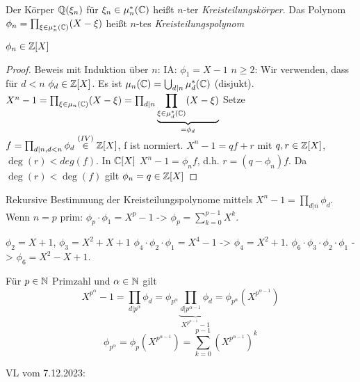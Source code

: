 \documentclass[../main.tex]{subfiles}
\begin{document}
\begin{definition}
    Der Körper $\mathbb{Q}(\xi_n)$ für $\xi_n\in\mu_n^*(\mathbb{C})$ heißt $n$-ter \emph{Kreisteilungskörper}.
    Das Polynom $\phi_n=\prod_{\xi\in\mu_n^*(\mathbb{C})} (X-\xi)$ heißt $n$-tes \emph{Kreisteilungspolynom}
\end{definition}

\begin{lemma}
    $\phi_n\in\mathbb{Z}[X]$
\end{lemma}
\begin{proof}
    Beweis mit Induktion über $n$:
    IA: $\phi_1 = X-1$ \checkmark
    $n\geq 2$: Wir verwenden, dass für $d<n$ $\phi_d\in \mathbb{Z}[X]$.
    Es ist $\mu_n(\mathbb{C}) = \bigcup_{d|n}\mu_d^*(\mathbb{C})$ (disjukt).
    $X^n-1 = \prod_{\xi\in\mu_n(\mathbb{C})} (X-\xi) = \prod_{d|n}\underbrace{\prod_{\xi\in\mu_d^*(\mathbb{C})}(X-\xi)}_{=\phi_d}$
    Setze $f = \prod_{d|n,d<n}\phi_d \overset{(IV)}{\in}\mathbb{Z}[X]$, f ist normiert.
    $X^n-1=qf+r$ mit $q,r\in \mathbb{Z}[X]$, $\deg(r)<deg(f)$.
    In $\mathbb{C}[X]$ $X^n-1=\phi_n f$, d.h. $r = (q-\phi_n) f$.
    Da $\deg(r)<\deg(f)$ gilt $\phi_n=q\in \mathbb{Z}[X]$
\end{proof}
\begin{remark}
    Rekursive Bestimmung der Kreisteilungspolynome mittels $X^n-1 = \prod_{d|n}\phi_d$.
    Wenn $n =p$ prim: $\phi_p \cdot \phi_1 = X^p-1$ -> $\phi_p = \sum_{k=0}^{p-1} X^k$.

    $\phi_2 = X+1$, $\phi_3 = X^2+X+1$
    $\phi_4 \cdot \phi_2 \cdot \phi_1 = X^4 -1$ -> $\phi_4 =X^2+1$.
    $\phi_6\cdot\phi_3\cdot\phi_2\cdot\phi_1$ -> $\phi_6 = X^2-X+1$.

    Für $p\in \mathbb{N}$ Primzahl und $\alpha\in\mathbb{N}$ gilt
    $$X^{p^\alpha}-1 = \prod_{d|p^\alpha} \phi_d = \phi_{p^\alpha} \underbrace{\prod_{d|p^{\alpha-1}} \phi_d}_{X^{p^{\alpha-1}}-1}=\phi_{p^\alpha} (X^{p^{\alpha-1}})$$
    $$\phi_{p^\alpha} = \phi_p(X^{p^{\alpha-1}}) = \sum_{k=0}^{p-1} (X^{p^{\alpha -1}})^k$$
\end{remark}

\begin{flushright}
VL vom 7.12.2023:
\end{flushright}
\end{document}
